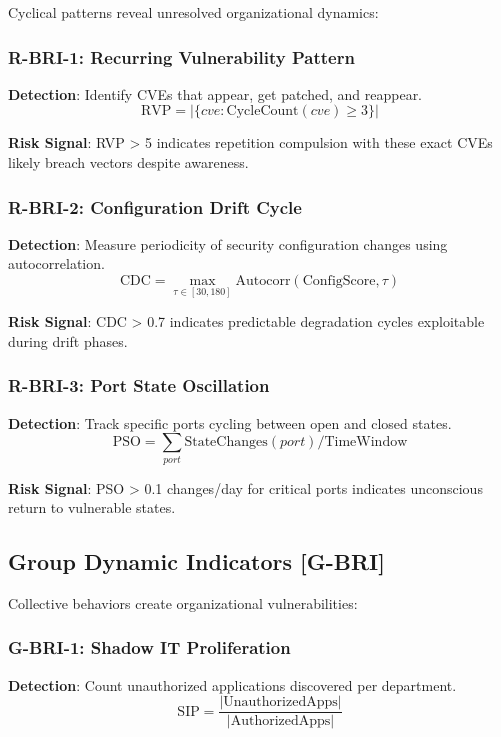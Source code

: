 \documentclass[11pt,a4paper]{article}
\begin{document}
Cyclical patterns reveal unresolved organizational dynamics:

\subsubsection{R-BRI-1: Recurring Vulnerability Pattern}
\textbf{Detection}: Identify CVEs that appear, get patched, and reappear.
\begin{equation}
\text{RVP} = |\{cve : \text{CycleCount}(cve) \geq 3\}|
\end{equation}

\textbf{Risk Signal}: RVP > 5 indicates repetition compulsion with these exact CVEs likely breach vectors despite awareness.

\subsubsection{R-BRI-2: Configuration Drift Cycle}
\textbf{Detection}: Measure periodicity of security configuration changes using autocorrelation.
\begin{equation}
\text{CDC} = \max_{\tau \in [30,180]} \text{Autocorr}(\text{ConfigScore}, \tau)
\end{equation}

\textbf{Risk Signal}: CDC > 0.7 indicates predictable degradation cycles exploitable during drift phases.

\subsubsection{R-BRI-3: Port State Oscillation}
\textbf{Detection}: Track specific ports cycling between open and closed states.
\begin{equation}
\text{PSO} = \sum_{port} \text{StateChanges}(port) / \text{TimeWindow}
\end{equation}

\textbf{Risk Signal}: PSO > 0.1 changes/day for critical ports indicates unconscious return to vulnerable states.

\subsection{Group Dynamic Indicators [G-BRI]}

Collective behaviors create organizational vulnerabilities:

\subsubsection{G-BRI-1: Shadow IT Proliferation}
\textbf{Detection}: Count unauthorized applications discovered per department.
\begin{equation}
\text{SIP} = \frac{|\text{UnauthorizedApps}|}{|\text{AuthorizedApps}|}
\end{equation}
\end{document}
